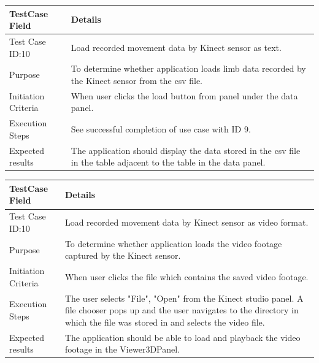 \documentclass[a4paper, 12pt]{article}
\begin{document}
\begin{table}[!htb]
 \begin{tabular}{|p{4cm}|p{10cm}|}
 \hline
  TestCase Field & Details \\
  \hline
   Test Case ID:10 & Load recorded movement data by Kinect sensor as text. \\
  \hline 
   Purpose & To determine whether application loads limb data recorded by the Kinect sensor from the csv file. \\
  \hline
   Initiation Criteria & When user clicks the load button from panel under the data panel.  \\
  \hline
   Execution Steps & See successful completion of use case with ID 9.  \\
  \hline
   Expected results & The application should display the data stored in the csv file in the table adjacent to the table in the data panel. \\
  \hline
 \end{tabular}
\end{table}


\begin{table}[!htb]
 \begin{tabular}{|p{4cm}|p{10cm}|}
 \hline
  TestCase Field & Details \\
  \hline
   Test Case ID:10 & Load recorded movement data by Kinect sensor as video format. \\
  \hline 
   Purpose & To determine whether application loads the video footage captured by the Kinect sensor. \\
  \hline
   Initiation Criteria & When user clicks the file which contains the saved video footage. \\
  \hline
   Execution Steps & The user selects "File", "Open" from the Kinect studio panel. A file chooser pops up and the user navigates to the directory in which the file was stored in and selects the video file.  \\
  \hline
   Expected results & The application should be able to load and playback the video footage in the Viewer3DPanel. \\
  \hline
 \end{tabular}
\end{table}
\end{document}
